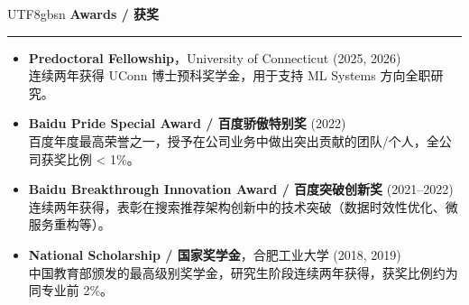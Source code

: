 \documentclass[]{resume}
\renewenvironment{rSection}[1]{%
  \vspace{0.5em}%
  \textbf{#1}%
  \vspace{0.16em}%
  \hrule
  \vspace{0.25em}%
  \begin{list}{}{%
    \setlength{\leftmargin}{0.85em}%
    \setlength{\rightmargin}{0em}%
    \setlength{\itemsep}{0pt}%
    \setlength{\topsep}{0pt}%
    \setlength{\parsep}{0pt}%
    \setlength{\partopsep}{0pt}%
  }%
  \item[]%
}{%
  \end{list}%
  \vspace{-0.28em}%
}
\begin{document}
\begin{CJK}{UTF8}{gbsn}
\begin{rSection}{Awards / 获奖}
\begin{itemize}
    \item \textbf{Predoctoral Fellowship}，University of Connecticut (2025, 2026)\\
    连续两年获得 UConn 博士预科奖学金，用于支持 ML Systems 方向全职研究。
    \item \textbf{Baidu Pride Special Award / 百度骄傲特别奖} (2022)\\
    百度年度最高荣誉之一，授予在公司业务中做出突出贡献的团队/个人，全公司获奖比例 < 1\%。
    \item \textbf{Baidu Breakthrough Innovation Award / 百度突破创新奖} (2021--2022)\\
    连续两年获得，表彰在搜索推荐架构创新中的技术突破（数据时效性优化、微服务重构等）。
    \item \textbf{National Scholarship / 国家奖学金}，合肥工业大学 (2018, 2019)\\
    中国教育部颁发的最高级别奖学金，研究生阶段连续两年获得，获奖比例约为同专业前 2\%。
\end{itemize}
\end{rSection}

\end{CJK}
\end{document}
